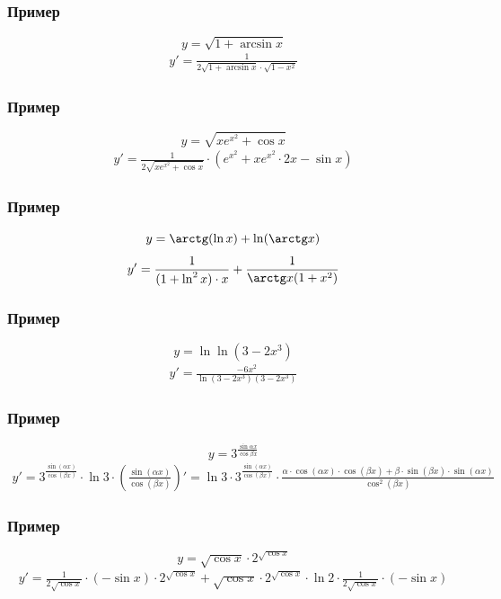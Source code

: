 \documentclass{article}
\begin{document}
\subsubsection{Пример}
\[
    y = \sqrt{1 + \arcsin x}
\]
\begin{gather*}
    y' = \frac{1}{2 \sqrt{1 + \arcsin x} \cdot \sqrt{1 - x^2}}    
\end{gather*}

\subsubsection{Пример}
\[
    y = \sqrt{xe^{x^2} + \cos x}
\]
\begin{gather*}
    y' = \frac{1}{2 \sqrt{xe^{x^2} + \cos x}} \cdot \left( e^{x^2} + xe^{x^2} \cdot 2x - \sin x \right)
\end{gather*}

\subsubsection{Пример}
\[
    y = \arctg(\ln x) + \ln(\arctg x)
\]
\begin{gather*}
    y' = \frac{1}{(1 + \ln^2 x) \cdot x} + \frac{1}{\arctg x (1 + x^2)}
\end{gather*}

\subsubsection{Пример}
\[
    y = \ln \ln(3 - 2x^3)
\]
\begin{gather*}
    y' = \frac{-6x^2}{\ln(3 - 2x^3)(3 - 2x^3)}
\end{gather*}

\subsubsection{Пример}
\[
    y = 3^{\frac{\sin \alpha x}{\cos \beta x}}
\]
\begin{gather*}
    y' = 3^{\frac{\sin (\alpha x)}{\cos (\beta x)}} \cdot \ln 3 \cdot \left( \frac{\sin (\alpha x)}{\cos (\beta x)} \right)' =
    \ln 3 \cdot 3^{\frac{\sin (\alpha x)}{\cos (\beta x)}} \cdot 
    \frac{\alpha \cdot \cos (\alpha x) \cdot \cos (\beta x) + \beta \cdot \sin (\beta x) \cdot \sin (\alpha x)}{\cos^2 (\beta x)}
\end{gather*}

\subsubsection{Пример}
\[
    y = \sqrt{\cos x} \cdot 2^{\sqrt{\cos x}}
\]
\begin{gather*}
    y' = \frac{1}{2\sqrt{\cos x}} \cdot (-\sin x) \cdot 2^{\sqrt{\cos x}} +
    \sqrt{\cos x} \cdot 2^{\sqrt{\cos x}} \cdot \ln 2 \cdot \frac{1}{2\sqrt{\cos x}} \cdot (-\sin x)
\end{gather*}
\end{document}

